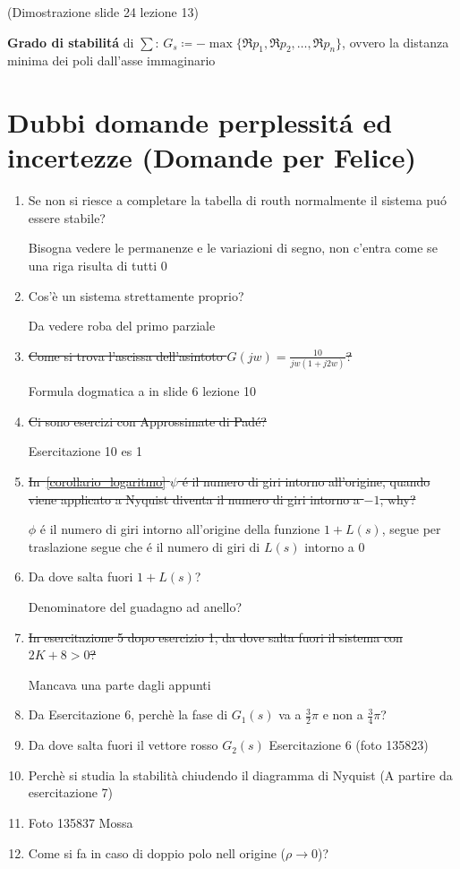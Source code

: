 \documentclass{article}
\begin{document}
(Dimostrazione slide 24 lezione 13)

\textbf{Grado di stabilit\'a} di $\sum$: $ G_s \coloneqq -\max\{\Re p_1, \Re p_2, \ldots, \Re p_n\} $, ovvero la distanza minima dei poli dall'asse immaginario
\newpage
\section{Dubbi domande perplessit\'a ed incertezze (Domande per Felice)}
\begin{enumerate}
    \item Se non si riesce a completare la tabella di routh normalmente il sistema pu\'o essere stabile?

        Bisogna vedere le permanenze e le variazioni di segno, non c'entra come se una riga risulta di tutti 0
    \item Cos'\`e un sistema strettamente proprio?

        Da vedere roba del primo parziale
    \item \sout{Come si trova l'ascissa dell'asintoto  $G(jw) = \frac{10}{jw(1 + j2w)}$? }

        Formula dogmatica a in slide 6 lezione 10
    \item \sout{Ci sono esercizi con Approssimate di Pad\'e?}

        Esercitazione 10 es 1
    \item{\sout{In~\ref{corollario_logaritmo} $\psi$ \'e il numero di giri intorno all'origine, quando viene applicato a Nyquist diventa il numero di giri intorno a $-1$, why?}}

        $\phi$ \'e il numero di giri intorno all'origine della funzione $1+L(s)$, segue per traslazione segue che \'e il numero di giri di $L(s)$ intorno a $0$
    \item Da dove salta fuori $1 + L(s)$?

        Denominatore del guadagno ad anello?

    \item \sout{In esercitazione 5 dopo esercizio 1, da dove salta fuori il sistema con $2K+8>0$?}

        Mancava una parte dagli appunti

    \item Da Esercitazione 6, perch\`e la fase di $G_1(s)$ va a $\frac{3}{2} \pi$ e non a $\frac{3}{4} \pi$?

    \item Da dove salta fuori il vettore rosso $G_2(s)$ Esercitazione 6 (foto 135823)
    \item Perch\`e si studia la stabilit\`a chiudendo il diagramma di Nyquist (A partire da esercitazione 7)
    \item Foto 135837 Mossa
    \item Come si fa in caso di doppio polo nell origine ($\rho \to 0$)?
\end{enumerate}
\end{document}
